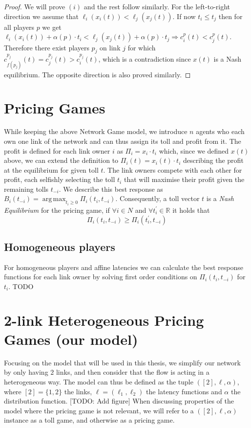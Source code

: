 \documentclass[10pt,a4paper]{book}
\newcommand{\R}{\mathbb{R}}
\DeclareMathOperator*{\argmax}{arg\,max}
\theoremstyle{definition}
\theoremstyle{comment}
\begin{document}
\begin{proof}
	We will prove $(i)$ and the rest follow similarly.
	For the left-to-right direction we assume that $\ell_i(x_i(t)) < \ell_j(x_j(t))$.
	If now $t_i \le t_j$ then for all players $p$ we get $\ell_i(x_i(t)) + \alpha(p) \cdot t_i < \ell_j(x_j(t)) + \alpha(p) \cdot t_j \Rightarrow c_i^p(t) < c_j^p(t)$.
	Therefore there exist players $p_j$ on link $j$ for which $c_{f(p_j)}^{p_j}(t) = c_j^{p_j}(t) > c_i^{p_j}(t)$, which is a contradiction since $x(t)$ is a Nash equilibrium.
	The opposite direction is also proved similarly.
\end{proof}

\section*{Pricing Games}

While keeping the above Network Game model, we introduce $n$ agents who each own one link of the network and can thus assign its toll and profit from it.
The profit is defined for each link owner $i$ as $\Pi_i = x_i \cdot t_i$ which, since we defined $x(t)$ above, we can extend the definition to $\Pi_i(t) = x_i(t) \cdot t_i$ describing the profit at the equilibrium for given toll $t$.
The link owners compete with each other for profit, each selfishly selecting the toll $t_i$ that will maximise their profit given the remaining tolls $t_{-i}$.
We describe this best response as $B_i(t_{-i}) = \argmax_{t_i \geq 0} \Pi_i(t_i, t_{-i})$.
Consequently, a toll vector $t$ is a \textit{Nash Equilibrium} for the pricing game, if $\forall i \in N$ and $\forall t_i^\prime \in \R$ it holds that
\[\Pi_i(t_i, t_{-i}) \geq \Pi_i(t_i^\prime, t_{-i})\]

\subsection*{Homogeneous players}

For homogeneous players and affine latencies we can calculate the best response functions for each link owner by solving first order conditions on $\Pi_i(t_i, t_{-i})$ for $t_i$. TODO

\section*{2-link Heterogeneous Pricing Games (our model)}

Focusing on the model that will be used in this thesis, we simplify our network by only having $2$ links, and then consider that the flow is acting in a heterogeneous way.
The model can thus be defined as the tuple $([2], \ell, \alpha)$, where $[2] = \{1, 2\}$ the links, $\ell = (\ell_1, \ell_2)$ the latency functions and $\alpha$ the distribution function.
[TODO: Add figure]
When discussing properties of the model where the pricing game is not relevant, we will refer to a $([2], \ell, \alpha)$ instance as a toll game, and otherwise as a pricing game.
\end{document}
